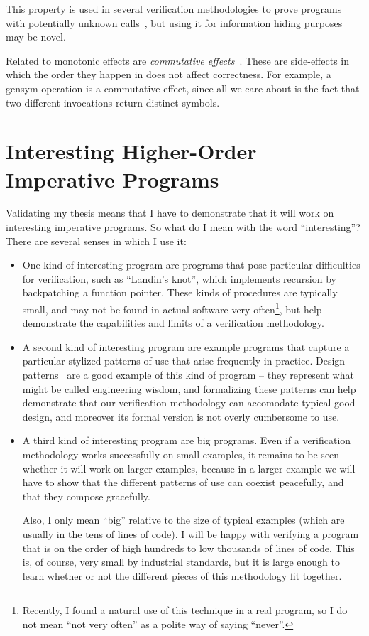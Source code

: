 This property is used in several verification methodologies to prove
programs with potentially unknown calls~\cite{boogie-sub-obs}, but 
using it for information hiding purposes may be novel. 

Related to monotonic effects are \emph{commutative effects}~\cite{idioms}. 
These are side-effects in which the order they happen in does not affect
correctness. For example, a gensym operation is a commutative effect, since 
all we care about is the fact that two different invocations return distinct
symbols. 




\section{Interesting Higher-Order Imperative Programs}

Validating my thesis means that I have to demonstrate that it will
work on interesting imperative programs. So what do I mean with the
word ``interesting''? There are several senses in which I use it:

\begin{itemize}
\item One kind of interesting program are programs that pose
  particular difficulties for verification, such as ``Landin's knot'',
  which implements recursion by backpatching a function pointer. These
  kinds of procedures are typically small, and may not be found in
  actual software very often\footnote{Recently, I found a natural use
    of this technique in a real program, so I do not mean ``not very
    often'' as a polite way of saying ``never''.}, but help
  demonstrate the capabilities and limits of a verification
  methodology.

\item A second kind of interesting program are example programs that
  capture a particular stylized patterns of use that arise frequently
  in practice. Design patterns~\cite{gof} are a good example of this
  kind of program -- they represent what might be called engineering
  wisdom, and formalizing these patterns can help demonstrate that our
  verification methodology can accomodate typical good design, and
  moreover its formal version is not overly cumbersome to use. 

\item A third kind of interesting program are big programs. Even if a
  verification methodology works successfully on small examples, it
  remains to be seen whether it will work on larger examples, because
  in a larger example we will have to show that the different patterns
  of use can coexist peacefully, and that they compose gracefully. 

  Also, I only mean ``big'' relative to the size of typical examples
  (which are usually in the tens of lines of code). I will be happy
  with verifying a program that is on the order of high hundreds to
  low thousands of lines of code. This is, of course, very small by
  industrial standards, but it is large enough to learn whether or
  not the different pieces of this methodology fit together. 
\end{itemize}


